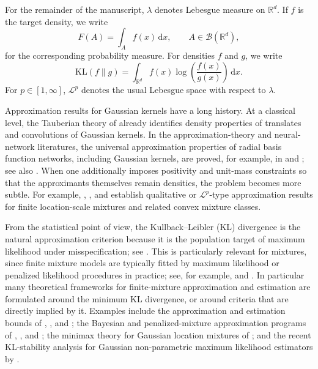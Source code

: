 \documentclass[11pt]{article}
\theoremstyle{definition}
\begin{document}
For the remainder of the manuscript, $\lambda$ denotes Lebesgue measure on $\mathbb{R}^d$. If $f$ is the target density, we write
\[
F(A)=\int_A f(x)\,\mathrm{d}x,
\qquad A\in\mathcal B(\mathbb{R}^d),
\]
for the corresponding probability measure. For densities $f$ and $g$, we write
\[
\mathrm{KL}(f\|g)=\int_{\mathbb{R}^d} f(x)\log\!\left(\frac{f(x)}{g(x)}\right)\,\mathrm{d}x.
\]
For $p\in[1,\infty]$, $\mathcal L^p$ denotes the usual Lebesgue space with respect to $\lambda$.

Approximation results for Gaussian kernels have a long history. At a classical level, the Tauberian theory of \citet{Wiener1932} already identifies density properties of translates and convolutions of Gaussian kernels. In the approximation-theory and neural-network literatures, the universal approximation properties of radial basis function networks, including Gaussian kernels, are proved, for example, in \citet{ParkSandberg1991} and \citet{ParkSandberg1993}; see also \citet[Chapter~20]{CheneyLight2009}. When one additionally imposes positivity and unit-mass constraints so that the approximants themselves remain densities, the problem becomes more subtle. For example, \citet{Bacharoglou2010}, \citet{NguyenEtAl2020}, and \citet{NguyenTTEtAl2022} establish qualitative or $\mathcal L^p$-type approximation results for finite location-scale mixtures and related convex mixture classes. 

From the statistical point of view, the Kullback--Leibler (KL) divergence is the natural approximation criterion because it is the population target of maximum likelihood under misspecification; see \citet{White1982}. This is particularly relevant for mixtures, since finite mixture models are typically fitted by maximum likelihood or penalized likelihood procedures in practice; see, for example, \citet{McLachlanPeel2000} and \citet{Chen2023}. In particular many theoretical frameworks for finite-mixture approximation and estimation are formulated around the minimum KL divergence, or around criteria that are directly implied by it. Examples include the approximation and estimation bounds of \citet{ZeeviMeir1997}, \citet{LiBarron2000}, and \citet{RakhlinPanchenkoMukherjee2005}; the Bayesian and penalized-mixture approximation programs of \citet{KruijerRousseauvdV2010}, \citet{MaugisMichel2011}, and \citet{MaugisRabusseauMichel2013}; the minimax theory for Gaussian location mixtures of \citet{KimGuntuboyina2022}; and the recent KL-stability analysis for Gaussian non-parametric maximum likelihood estimators by \citet{GhoshGuntuboyinaMukherjeeTran2026}.
\end{document}
